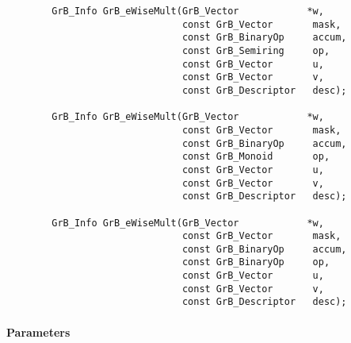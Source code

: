 \begin{verbatim}
        GrB_Info GrB_eWiseMult(GrB_Vector            *w,
                               const GrB_Vector       mask,
                               const GrB_BinaryOp     accum,
                               const GrB_Semiring     op, 
                               const GrB_Vector       u,
                               const GrB_Vector       v,
                               const GrB_Descriptor   desc);
                            
        GrB_Info GrB_eWiseMult(GrB_Vector            *w,
                               const GrB_Vector       mask,
                               const GrB_BinaryOp     accum,
                               const GrB_Monoid       op, 
                               const GrB_Vector       u,
                               const GrB_Vector       v,
                               const GrB_Descriptor   desc);
                            
        GrB_Info GrB_eWiseMult(GrB_Vector            *w,
                               const GrB_Vector       mask,
                               const GrB_BinaryOp     accum,
                               const GrB_BinaryOp     op, 
                               const GrB_Vector       u,
                               const GrB_Vector       v,
                               const GrB_Descriptor   desc);
\end{verbatim}

\paragraph{Parameters}

